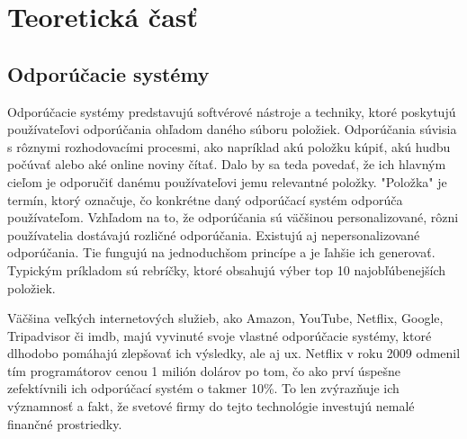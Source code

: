 \section{Teoretická časť}

\subsection{Odporúčacie systémy}
\label{sec:odporucacie systemy}
 Odporúčacie systémy predstavujú softvérové nástroje a techniky, ktoré poskytujú používateľovi odporúčania ohľadom daného súboru položiek. Odporúčania súvisia s rôznymi rozhodovacími procesmi, ako napríklad akú položku kúpiť, akú hudbu počúvať alebo aké online noviny čítať. Dalo by sa teda povedať, že ich hlavným cieľom je odporučiť danému používateľovi jemu relevantné položky. "Položka" je termín, ktorý označuje, čo konkrétne daný odporúčací systém odporúča používateľom. Vzhľadom na to, že odporúčania sú väčšinou personalizované, rôzni používatelia dostávajú rozličné odporúčania. Existujú aj nepersonalizované odporúčania. Tie fungujú na jednoduchšom princípe a je ľahšie ich generovať. Typickým príkladom sú rebríčky, ktoré obsahujú výber top 10 najobľúbenejších položiek. \cite{rs1} 
 
Väčšina veľkých internetových služieb, ako Amazon, YouTube, Netflix, Google, Tripadvisor či \acrshort{imdb}, majú vyvinuté svoje vlastné odporúčacie systémy, ktoré dlhodobo pomáhajú zlepšovať ich výsledky, ale aj \acrshort{ux}. Netflix v roku 2009 odmenil tím programátorov cenou 1 milión dolárov po tom, čo ako prví úspešne zefektívnili ich odporúčací systém o takmer 10\%. To len zvýrazňuje ich významnosť a fakt, že svetové firmy do tejto technológie investujú nemalé finančné prostriedky. \cite{rs1}

